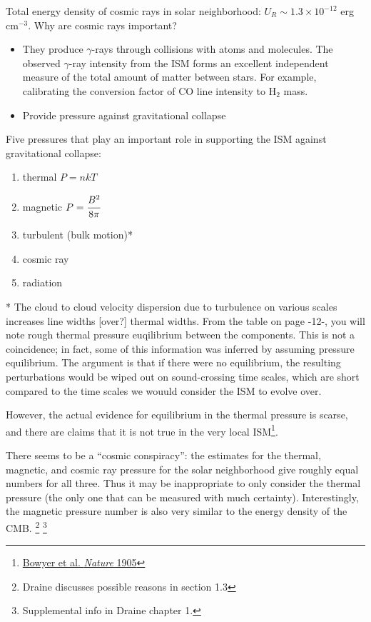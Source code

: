 \documentclass[12pt]{article}
\newcommand{\mar}[1]{\hspace{0pt}\marginpar{-\textcolor{black}{#1}-}}
\begin{document}
Total energy density of cosmic rays in solar neighborhood:
$U_{R} \sim 1.3\times10^{-12}$ erg cm$^{-3}$.
\mar{14}Why are cosmic rays important?
\begin{itemize}
    \item They produce $\gamma$-rays through collisions with atoms and
        molecules. The observed $\gamma$-ray intensity from the ISM forms
        an excellent independent measure of the total amount of matter
        between stars. For example, calibrating the conversion factor of
        CO line intensity to H$_{2}$ mass.
    \item Provide pressure against gravitational collapse
\end{itemize}
Five pressures that play an important role in supporting the ISM against
gravitational collapse:
\begin{enumerate}
    \item thermal $P=nkT$
    \item magnetic $P=\cfrac{B^{2}}{8\pi}$
    \item turbulent (bulk motion)*
    \item cosmic ray
    \item radiation
\end{enumerate}
* The cloud to cloud velocity dispersion due to turbulence on various
scales increases line widths [over?] thermal widths. From the table
on page -12-, you will note rough thermal pressure euqilibrium between
the components. This is not a coincidence; in fact, some of this
information was inferred by assuming pressure equilibrium. The
argument is that if there were no equilibrium, the resulting
perturbations would be wiped out on sound-crossing time scales, which
are short compared to\mar{15} the time scales we wouuld
consider the ISM to evolve over.

However, the actual evidence for equilibrium in the thermal pressure
is scarse, and there are claims that it is not true in the very local
ISM\footnote{\href{http://www.nature.com/nature/journal/v375/n6528/abs/375212a0.html}
{Bowyer et al. \textit{Nature} 1905}}.

There seems to be a ``cosmic conspiracy'': the estimates for the
thermal, magnetic, and cosmic ray pressure for the solar neighborhood
give roughly equal numbers for all three. Thus it may be inappropriate
to only consider the thermal pressure (the only one that can be
measured with much certainty). Interestingly, the magnetic pressure
number is also very similar to the energy density of the CMB\@.
\footnote{Draine discusses possible reasons in section 1.3}
\footnote{Supplemental info in Draine chapter 1.}
\end{document}
